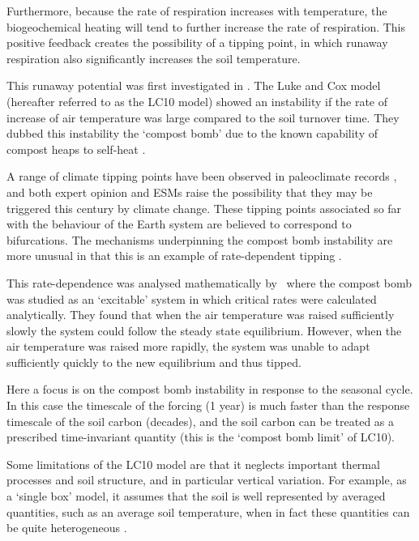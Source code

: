 Furthermore, because the rate of respiration increases with temperature, the biogeochemical heating will tend to
further increase the rate of respiration. This positive feedback creates the possibility of a tipping point, in which
runaway respiration also significantly increases the soil temperature.

This runaway potential was first investigated in \cite{Luke2011}. The Luke and Cox model (hereafter referred to as the LC10 model)
showed an instability if the rate of increase of air temperature was large compared to the soil turnover time. They dubbed this instability
the `compost bomb' due to the known capability of compost heaps to self-heat \parencite{Nelson2007,Sidhu2007,Browne1929}.

A range of climate tipping points have been observed in
paleoclimate records \parencite{Alley2003}, and both expert opinion \parencite{Lenton2008} and ESMs \parencite{Drijfhout2015} raise the possibility that they may be triggered this century by climate change.
These tipping points associated so far with the behaviour of the Earth system are believed to
correspond to bifurcations. The mechanisms underpinning the compost bomb instability are more unusual in that this is an example of rate-dependent tipping \parencite{Ashwin2012}.

This rate-dependence was analysed mathematically
by~\cite{Wieczorek2011} where the compost bomb was studied as an `excitable' system in which critical rates
were calculated analytically. They found that when the air temperature was
raised sufficiently slowly the system could follow the steady state equilibrium. However, when the air temperature was raised more rapidly,
the system was unable to adapt sufficiently quickly to the new equilibrium and thus tipped.

Here a focus is on the compost bomb instability in response to the seasonal cycle. In this case the timescale of the forcing (1 year) is much faster than the response timescale of the soil carbon
(decades), and the soil carbon can be treated as a prescribed time-invariant quantity (this is the `compost bomb limit' of LC10). 

Some limitations of the LC10 model are that it neglects important thermal processes and soil structure, and in particular vertical variation.
For example, as a `single box' model, it assumes that the soil is well represented by averaged quantities, such as an average soil temperature,
when in fact these quantities can be quite heterogeneous \parencite{Gedney2003}.

